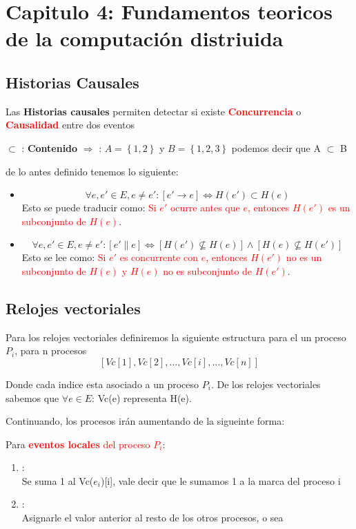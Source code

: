 \section{Capitulo 4: Fundamentos teoricos de la computación distriuida}
\subsection{Historias Causales}
Las \textbf{Historias causales} permiten detectar si existe \textcolor{red}{\textbf{Concurrencia}} o \textcolor{red}{\textbf{Causalidad}} entre dos eventos

\begin{center}
    $\subset$ : \textbf{Contenido} $\Rightarrow$ : $A=\left\{1,2\right\} $ y $B=\left\{1,2,3\right\}$ podemos decir que A $\subset$ B
\end{center}

de lo antes definido tenemos lo siguiente:

\begin{itemize}
    \item \[ \forall e, e' \in E, e \neq e' : [e' \rightarrow e] \Leftrightarrow H(e') \subset H(e) \]
    Esto se puede traducir como: \textcolor{red}{Si $e'$ ocurre antes que $e$, entonces $H(e')$ es un subconjunto de $H(e)$}.

    \item \[ \forall e, e' \in E, e \neq e' : [e' \parallel e] \Leftrightarrow [H(e') \nsubseteq H(e)] \land [H(e) \nsubseteq H(e')] \]
    Esto se lee como: \textcolor{red}{Si $e'$ es concurrente con $e$, entonces $H(e')$ no es un subconjunto de $H(e)$ y $H(e)$ no es subconjunto de $H(e')$}.
\end{itemize}

\subsection{Relojes vectoriales}

Para los relojes vectoriales definiremos la siguiente estructura para el un proceso $P_i$, para n procesos
\[
   \left[ \mathit{Vc}[1], \mathit{Vc}[2], \dots, \mathit{Vc}[i], \dots, \mathit{Vc}[n] \right]
\]

Donde cada indice esta asociado a un proceso $P_i$. De los relojes vectoriales sabemos que $\forall e \in E$: Vc(e) representa H(e).

Continuando, los procesos irán aumentando de la sigueinte forma:

Para \textcolor{red}{\textbf{eventos locales} del proceso $P_i$}:
\begin{enumerate}[label=\textbf{Paso \arabic*:}]
    \item :\\
    Se suma 1 al Vc($e_i$)[i], vale decir que le sumamos 1 a la marca del proceso i
    \item :\\
    Asignarle el valor anterior al resto de los otros procesos, o sea 
    

\end{enumerate}
